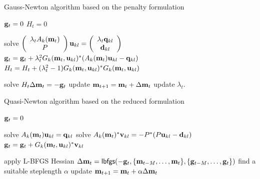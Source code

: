 \documentclass{iopart}
\begin{document}
\begin{algorithm}
\caption{Gauss-Newton algorithm based on the penalty formulation}
\label{GN1}
\begin{algorithmic}
\STATE $\mathbf{g}_t = 0$
\STATE $H_t = 0$

\STATE solve $\left(\begin{array}{c} \lambda_t A_k(\mathbf{m}_t) \\ P \end{array}\right)\mathbf{u}_{kl} = \left(\begin{array}{c}\lambda_t\mathbf{q}_{kl}\\ \mathbf{d}_{kl} \end{array}\right)$
\STATE $\mathbf{g}_t = \mathbf{g}_t  + \lambda_t^2G_k(\mathbf{m}_t, \mathbf{u}_{kl})^*(A_k(\mathbf{m}_t)\mathbf{u}_{kl} - \mathbf{q}_{kl})$
\STATE $H_t = H_t + (\lambda_t^2 - 1)G_k(\mathbf{m}_t, \mathbf{u}_{kl})^*G_k(\mathbf{m}_t, \mathbf{u}_{kl})$
\ENDFOR


\ENDFOR

\STATE solve $H_t\Delta \mathbf{m}_t = -\mathbf{g}_t$
\STATE update $\mathbf{m}_{t+1} = \mathbf{m}_t + \Delta \mathbf{m}_t$
\STATE update $\lambda_t$.
\ENDFOR
\end{algorithmic}
\end{algorithm}

\begin{algorithm}
\caption{Quasi-Newton algorithm based on the reduced formulation}
\label{QN2}
\begin{algorithmic}
\STATE $\mathbf{g}_t = 0$

\STATE solve $A_k(\mathbf{m}_t)\mathbf{u}_{kl} =\mathbf{q}_{kl}$
\STATE solve $A_k(\mathbf{m}_t)^*\mathbf{v}_{kl} = -P^*(P\mathbf{u}_{kl} - \mathbf{d}_{kl})$
\STATE $\mathbf{g}_t = \mathbf{g}_t  + G_k(\mathbf{m}_t, \mathbf{u}_{kl})^*\mathbf{v}_{kl}$
\ENDFOR

\ENDFOR

\STATE apply L-BFGS Hessian $\Delta \mathbf{m}_t = \mathsf{lbfgs}(-\mathbf{g}_t,\{\mathbf{m}_{t-M}, \ldots, \mathbf{m}_t\},\{\mathbf{g}_{t-M}, \ldots, \mathbf{g}_t\})$
\STATE find a suitable steplength $\alpha$ 
\STATE update $\mathbf{m}_{t+1} = \mathbf{m}_t + \alpha\Delta \mathbf{m}_t$
\ENDFOR
\end{algorithmic}
\end{algorithm}


\clearpage
\end{document}

